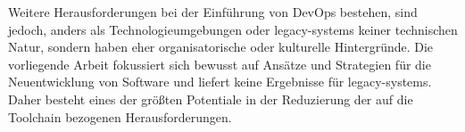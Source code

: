 Weitere Herausforderungen bei der Einführung von DevOps bestehen, sind jedoch, anders als Technologieumgebungen oder \Glspl{legacy-system} keiner technischen Natur, sondern haben eher organisatorische oder kulturelle Hintergründe. \cite{001:DevOps-Adoption-in-Software-Development} Die vorliegende Arbeit fokussiert sich bewusst auf Ansätze und Strategien für die Neuentwicklung von Software und liefert keine Ergebnisse für \Glspl{legacy-system}. Daher besteht eines der größten Potentiale in der Reduzierung der auf die Toolchain bezogenen Herausforderungen.
